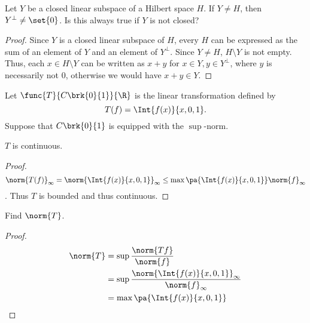 \documentclass[12pt,letterpaper,twoside]{hmcpset}
\begin{document}
\begin{problem}[6][15]
 Let $Y$ be a closed linear subspace of a Hilbert space $H$. If $Y \neq H$, then $Y^\perp \neq \set{0}$. Is this always true if $Y$ is not closed?
\end{problem}

\begin{solution}
 \begin{proof}
  Since $Y$ is a closed linear subspace of $H$, every $H$ can be expressed as 
the sum of an element of $Y$ and an element of $Y^\perp$. Since $Y \neq H$, $H 
\setminus Y$ is not empty. Thus, each $x \in H\setminus Y$ can be written as 
$x+y$ for $x\in Y, y \in Y^\perp$, where $y$ is necessarily not 0, otherwise we 
would have $x+y \in Y$.
 \end{proof}

\end{solution}


\begin{problem}[7][10]
 Let $\func{T}{C\brk{0}{1}}{\R}$ is the linear transformation defined by
 \[T(f) = \Int{f(x)}{x,0,1}.\]
 Suppose that $C\brk{0}{1}$ is equipped with the $\sup$-norm.
\end{problem}

\begin{problem}[7a]
 $T$ is continuous.
\end{problem}

\begin{solution}
 \begin{proof}
  \[\norm{T(f)}_\infty = \norm{\Int{f(x)}{x,0,1}}_\infty \leq \max\pa{\Int{f(x)}{x,0,1}}\norm{f}_\infty\].
  Thus $T$ is bounded and thus continuous.
 \end{proof}

\end{solution}


\begin{problem}[7b]
 Find $\norm{T}$.
\end{problem}

\begin{solution}
 \begin{proof}
  \begin{align*}
   \norm{T} &= \sup \frac{\norm{Tf}}{\norm{f}} \\
   {} &= \sup \frac{\norm{\Int{f(x)}{x,0,1}}_\infty}{\norm{f}_\infty} \\
   {} &= \max\pa{\Int{f(x)}{x,0,1}}
  \end{align*}
 \end{proof}

\end{solution}
\end{document}
